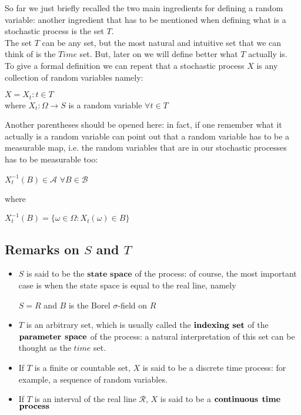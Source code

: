So far we just briefly recalled the two main ingredients for defining a random variable: another ingredient that has to be mentioned when defining what is a stochastic process is the set $T$. \\
The set $T$ can be any set, but the most natural and intuitive set that we can think of is the $Time$ set. But, later on we will define better what $T$ actually is.
\\
To give a formal definition we can repeat that a stochastic process $X$ is any collection of random variables namely:
\begin{center}
    $X = {X_t: t \in T}$ \\
    where $X_t: \Omega \longrightarrow S$ is a random variable $\forall t \in T$ 
\end{center}
\newpage
Another parentheses should be opened here: in fact, if one remember what it actually is a random variable can point out that a random variable has to be a measurable map, i.e. the random variables that are in our stochastic processes has to be measurable too:\\
\begin{center}
    $X_t^{-1}(B) \in \mathcal{A}$   $\forall B\in \mathcal{B}$
\end{center}
where
\begin{center}
    $X_t^{-1}(B) = \{\omega \in \Omega: X_t(\omega) \in B\}$
\end{center}
\subsection{Remarks on $S$ and $T$}
\begin{itemize}
    \item $S$ is said to be the $\mathbf{state}$ $\mathbf{space}$ of the process: of course, the most important case is when the state space is equal to the real line, namely 
    \begin{center}
        $S=R$ and $B$ is the Borel $\sigma$-field on $R$
    \end{center}
    \item $T$ is an arbitrary set, which is usually called the $\bold{indexing}$ $\bold{set}$ of the $\bold{parameter}$ $\bold{space}$ of the process: a natural interpretation of this set can be thought as the $time$ set. 
    \item If $T$ is a finite or countable set, $X$ is said to be a discrete time process: for example, a sequence of random variables.
    \item If $T$ is an interval of the real line $\mathcal{R}$, $X$ is said to be a $\bold{continuous}$ $\bold{time}$ $\bold{process}$
\end{itemize}


